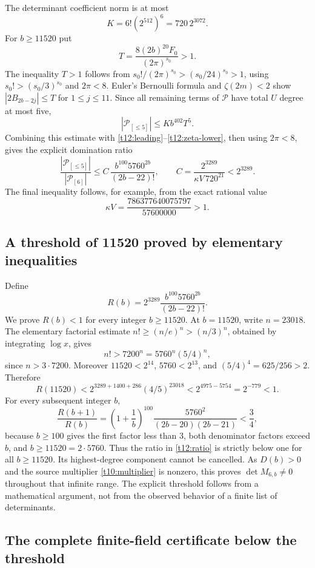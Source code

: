 The determinant coefficient norm is at most
\[
 K=6!(2^{512})^6=720\,2^{3072}.
\]
For $b\ge11520$ put
\[
 T=\frac{8(2b)^{20}F_0}{(2\pi)^{s_0}}>1.
\]
The inequality $T>1$ follows from $s_0!/(2\pi)^{s_0}>(s_0/24)^{s_0}>1$,
using $s_0!>(s_0/3)^{s_0}$ and $2\pi<8$.
Euler's Bernoulli formula and $\zeta(2m)<2$ show
$|2B_{2b-2j}|\le T$ for $1\le j\le11$.
Since all remaining terms of $\mathscr P$ have total $U$ degree
at most five,
\[
 |\mathscr P_{[\le5]}|\le Kb^{402}T^5.
\]
Combining this estimate with \eqref{t12:leading}--\eqref{t12:zeta-lower},
then using $2\pi<8$, gives the explicit domination ratio
\begin{equation}\label{t12:ratio}
 \frac{|\mathscr P_{[\le5]}|}{|\mathscr P_{[6]}|}
 \le C\,\frac{b^{100}5760^{2b}}{(2b-22)!},\qquad
 C=\frac{2^{3289}}{\kappa V\,720^{21}}<2^{3289}.
\end{equation}
The final inequality follows, for example, from the exact rational value
\[
 \kappa V=\frac{786377640075797}{57600000}>1.
\]

\subsection{A threshold of 11520 proved by elementary inequalities}

Define
\[
 R(b)=2^{3289}\frac{b^{100}5760^{2b}}{(2b-22)!}.
\]
We prove $R(b)<1$ for every integer $b\ge11520$. At $b=11520$,
write $n=23018$. The elementary factorial estimate
$n!\ge(n/e)^n>(n/3)^n$, obtained by integrating $\log x$, gives
\[
 n!>7200^n=5760^n(5/4)^n,
\]
since $n>3\cdot7200$. Moreover $11520<2^{14}$,
$5760<2^{13}$, and $(5/4)^4=625/256>2$. Therefore
\begin{equation}\label{t12:initial-bound}
 R(11520)
 <2^{3289+1400+286}(4/5)^{23018}
 <2^{4975-5754}=2^{-779}<1.
\end{equation}
For every subsequent integer $b$,
\[
 \frac{R(b+1)}{R(b)}
 =\left(1+\frac1b\right)^{100}
       \frac{5760^2}{(2b-20)(2b-21)}<\frac34,
\]
because $b\ge100$ gives the first factor less than $3$,
both denominator factors exceed $b$, and $b\ge11520=2\cdot5760$.
Thus the ratio in \eqref{t12:ratio} is strictly below one for all
$b\ge11520$. Its highest-degree component cannot be cancelled.
As $D(b)>0$ and the source multiplier \eqref{t10:multiplier} is
nonzero, this proves $\det M_{6,b}\ne0$ throughout that infinite
range. The explicit threshold follows from a mathematical argument,
not from the observed behavior of a finite list of determinants.

\subsection{The complete finite-field certificate below the threshold}

